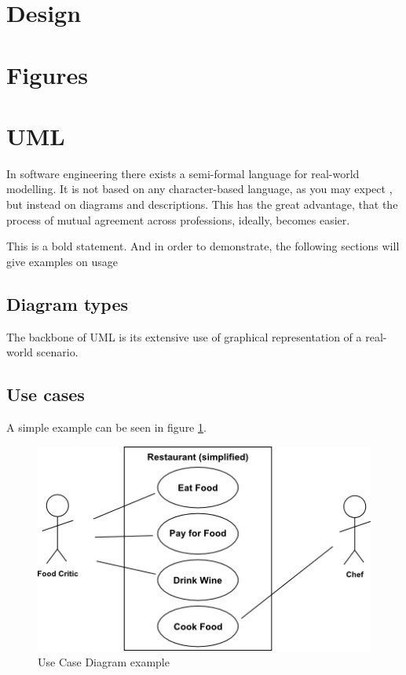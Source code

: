 \documentclass[10pt,a4paper]{article}
\begin{document}
\section{Design}



\appendix
\section{Figures}
\listoffigures

\section{UML}
In software engineering there exists a semi-formal language for real-world modelling. It is not based on any character-based language, as you may expect , but instead on diagrams and descriptions. This has the great advantage, that the process of mutual agreement across professions, ideally, becomes easier.

This is a bold statement. And in order to demonstrate, the following sections will give examples on usage
\subsection{Diagram types}
The backbone of UML is its extensive use of graphical representation of a real-world scenario. 

\subsection{Use cases}
A simple example can be seen in figure \ref{fig:use_case_diagram_example}.
\begin{figure}[h]
\centering
\includegraphics[scale=0.6]{fig/UML_Use_Case_diagram.png} 
\caption{Use Case Diagram example}
\label{fig:use_case_diagram_example}
\end{figure}
\end{document}
